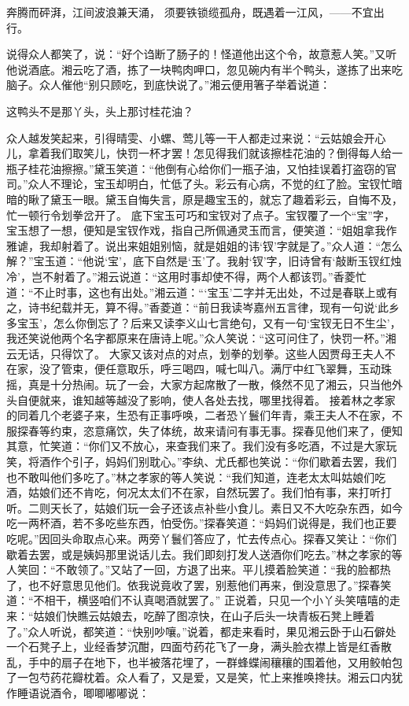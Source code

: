 \documentclass[12pt,oneside]{book}
\begin{document}
奔腾而砰湃，江间波浪兼天涌，
须要铁锁缆孤舟，既遇着一江风，——不宜出行。

说得众人都笑了，说：“好个诌断了肠子的！怪道他出这个令，故意惹人笑。”又听他说酒底。湘云吃了酒，拣了一块鸭肉呷口，忽见碗内有半个鸭头，遂拣了出来吃脑子。众人催他“别只顾吃，到底快说了。”湘云便用箸子举着说道：

这鸭头不是那丫头，头上那讨桂花油？

众人越发笑起来，引得晴雯、小螺、莺儿等一干人都走过来说：“云姑娘会开心儿，拿着我们取笑儿，快罚一杯才罢！怎见得我们就该擦桂花油的？倒得每人给一瓶子桂花油擦擦。”黛玉笑道：“他倒有心给你们一瓶子油，又怕挂误着打盗窃的官司。”众人不理论，宝玉却明白，忙低了头。彩云有心病，不觉的红了脸。宝钗忙暗暗的瞅了黛玉一眼。黛玉自悔失言，原是趣宝玉的，就忘了趣着彩云，自悔不及，忙一顿行令划拳岔开了。
底下宝玉可巧和宝钗对了点子。宝钗覆了一个“宝”字，宝玉想了一想，便知是宝钗作戏，指自己所佩通灵玉而言，便笑道：“姐姐拿我作雅谑，我却射着了。说出来姐姐别恼，就是姐姐的讳‘钗’字就是了。”众人道：“怎么解？”宝玉道：“他说‘宝’，底下自然是‘玉’了。我射‘钗’字，旧诗曾有‘敲断玉钗红烛冷’，岂不射着了。”湘云说道：“这用时事却使不得，两个人都该罚。”香菱忙道：“不止时事，这也有出处。”湘云道：“‘宝玉’二字并无出处，不过是春联上或有之，诗书纪载并无，算不得。”香菱道：“前日我读岑嘉州五言律，现有一句说‘此乡多宝玉’，怎么你倒忘了？后来又读李义山七言绝句，又有一句‘宝钗无日不生尘’，我还笑说他两个名字都原来在唐诗上呢。”众人笑说：“这可问住了，快罚一杯。”湘云无话，只得饮了。
大家又该对点的对点，划拳的划拳。这些人因贾母王夫人不在家，没了管束，便任意取乐，呼三喝四，喊七叫八。满厅中红飞翠舞，玉动珠摇，真是十分热闹。玩了一会，大家方起席散了一散，倏然不见了湘云，只当他外头自便就来，谁知越等越没了影响，使人各处去找，哪里找得着。
接着林之孝家的同着几个老婆子来，生恐有正事呼唤，二者恐丫鬟们年青，乘王夫人不在家，不服探春等约束，恣意痛饮，失了体统，故来请问有事无事。探春见他们来了，便知其意，忙笑道：“你们又不放心，来查我们来了。我们没有多吃酒，不过是大家玩笑，将酒作个引子，妈妈们别耽心。”李纨、尤氏都也笑说：“你们歇着去罢，我们也不敢叫他们多吃了。”林之孝家的等人笑说：“我们知道，连老太太叫姑娘们吃酒，姑娘们还不肯吃，何况太太们不在家，自然玩罢了。我们怕有事，来打听打听。二则天长了，姑娘们玩一会子还该点补些小食儿。素日又不大吃杂东西，如今吃一两杯酒，若不多吃些东西，怕受伤。”探春笑道：“妈妈们说得是，我们也正要吃呢。”因回头命取点心来。两旁丫鬟们答应了，忙去传点心。探春又笑让：“你们歇着去罢，或是姨妈那里说话儿去。我们即刻打发人送酒你们吃去。”林之孝家的等人笑回：“不敢领了。”又站了一回，方退了出来。平儿摸着脸笑道：“我的脸都热了，也不好意思见他们。依我说竟收了罢，别惹他们再来，倒没意思了。”探春笑道：“不相干，横竖咱们不认真喝酒就罢了。”
正说着，只见一个小丫头笑嘻嘻的走来：“姑娘们快瞧云姑娘去，吃醉了图凉快，在山子后头一块青板石凳上睡着了。”众人听说，都笑道：“快别吵嚷。”说着，都走来看时，果见湘云卧于山石僻处一个石凳子上，业经香梦沉酣，四面芍药花飞了一身，满头脸衣襟上皆是红香散乱，手中的扇子在地下，也半被落花埋了，一群蜂蝶闹穰穰的围着他，又用鲛帕包了一包芍药花瓣枕着。众人看了，又是爱，又是笑，忙上来推唤搀扶。湘云口内犹作睡语说酒令，唧唧嘟嘟说：
\end{document}
